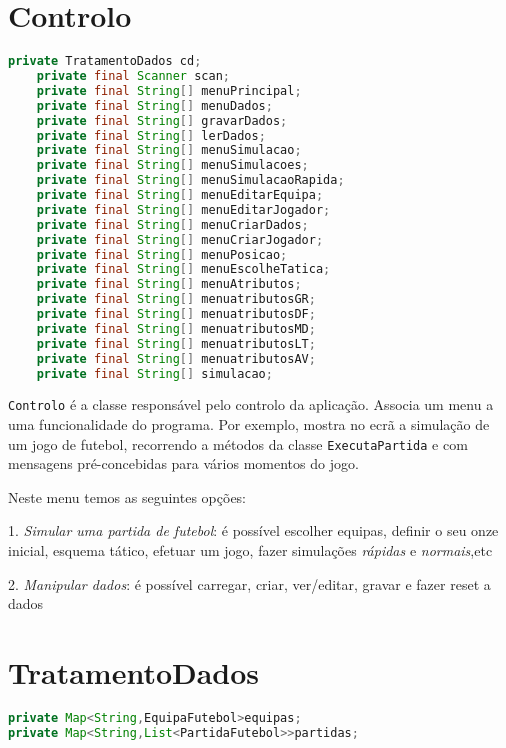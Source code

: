 \documentclass[a4paper]{report}
\begin{document}
	\section{Controlo}
	\begin{lstlisting}[language=Java]
    private TratamentoDados cd;
    private final Scanner scan;
    private final String[] menuPrincipal;
    private final String[] menuDados;
    private final String[] gravarDados;
    private final String[] lerDados;
    private final String[] menuSimulacao;
    private final String[] menuSimulacoes;
    private final String[] menuSimulacaoRapida;
    private final String[] menuEditarEquipa;
    private final String[] menuEditarJogador;
    private final String[] menuCriarDados;
    private final String[] menuCriarJogador;
    private final String[] menuPosicao;
    private final String[] menuEscolheTatica;
    private final String[] menuAtributos;
    private final String[] menuatributosGR;
    private final String[] menuatributosDF;
    private final String[] menuatributosMD;
    private final String[] menuatributosLT;
    private final String[] menuatributosAV;
    private final String[] simulacao;

	\end{lstlisting}
	\texttt{Controlo} é a classe responsável pelo controlo da aplicação. Associa um menu a uma funcionalidade do programa. Por exemplo, mostra no ecrã a simulação de um jogo de futebol, recorrendo a métodos da classe \texttt{ExecutaPartida} e com mensagens pré-concebidas para vários momentos do jogo. 
	
	 Neste menu temos as seguintes opções: \par
	 \vspace{0.05cm}
1. \textit{Simular uma partida de futebol}: é possível escolher equipas, definir o seu onze inicial, esquema tático, efetuar um jogo, fazer simulações \textit{rápidas} e \textit{normais},etc \par
2. \textit{Manipular dados}: é possível carregar, criar, ver/editar, gravar e fazer reset a dados

      
	
	\section{TratamentoDados}
	\begin{lstlisting}[language=Java]
private Map<String,EquipaFutebol>equipas;
private Map<String,List<PartidaFutebol>>partidas;
	\end{lstlisting}
	
\end{document}
